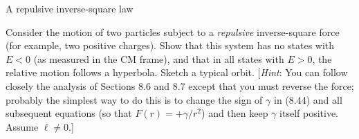 \documentclass[11pt,letterpaper,boxed]{../hmcpsetrhino}
\begin{document}
\newpage

\begin{problem}[iii]
A repulsive inverse-square law\\
\begin{problem}[8.13]
Consider the motion of two particles subject to a \textit{repulsive} inverse-square force (for example, two positive charges). Show that this system has no states with  $E < 0$ (as measured in the CM frame), and that in all states with $E > 0$, the relative motion follows a hyperbola. Sketch a typical orbit. [\textit{Hint}: You can follow closely the analysis of Sections 8.6 and 8.7 except that you must reverse the force; probably the simplest way to do this is to change the sign of $\gamma$ in (8.44) and all subsequent equations (so that $F(r) = +\gamma/r^2$) and then keep $\gamma$ itself positive. Assume $\ell \neq 0$.]
\end{problem}
\vspace{-0.45cm}
\end{problem}

\begin{solution}

\vfill
\end{solution}
\end{document}
